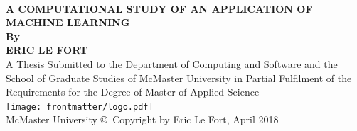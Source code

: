 \begin{titlepage}
\begin{changemargin}{0cm}{-1.4cm}
\begin{center}
	\vspace{1cm}~\\
	\textbf{\Large A COMPUTATIONAL STUDY OF AN APPLICATION OF MACHINE LEARNING}
	\vspace{2cm}~\\
	\textbf{By\\ ERIC LE FORT}
	\vspace{2cm}~\\
	A Thesis Submitted to the Department of Computing and Software and the School of Graduate Studies of McMaster University in Partial Fulfilment of the Requirements for the Degree of Master of Applied Science
	\vspace{2.3cm}~\\
	\texttt{[image: frontmatter/logo.pdf]}~\\
	\vspace{1.5cm}
	McMaster University \copyright~Copyright by Eric Le Fort, April 2018
\end{center}
\end{changemargin}
\end{titlepage}
	